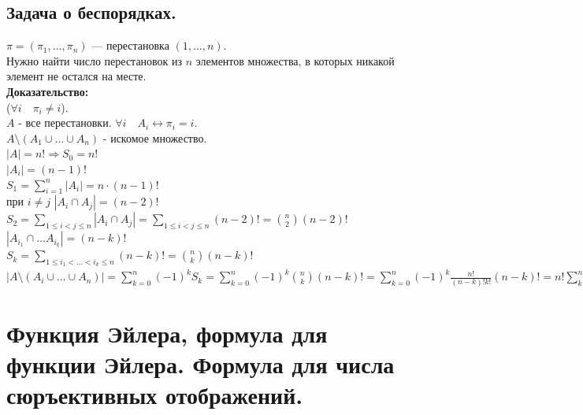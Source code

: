 \documentclass[12pt]{article}
\begin{document}
\subsection{Задача о беспорядках.}
	$ \pi = (\pi_1, \ldots ,\pi_n) $ — перестановка $(1,\ldots,n)$.\\
	Нужно найти число перестановок из $n$ элементов множества, в которых никакой элемент не остался на месте.\\	
	\textbf{Доказательство:}\\
	($\forall i \quad \pi_i \not= i$).\\
	$A$ - все перестановки. $\forall i \quad A_i \leftrightarrow \pi_i = i $.\\
	$ A \setminus (A_1 \cup \ldots \cup A_n)$ - искомое множество.\\
	$ |A| = n! \Rightarrow S_0 = n!$\\
	$ |A_i| = (n-1)! $\\
	$ \displaystyle S_1 = \sum_{i=1}^n |A_i| = n\cdot(n-1)!$\\
	при $i \neq j$ $ |A_i \cap A_j| = (n-2)!$\\
	$ \displaystyle S_2 = \sum_{1 \le i < j \le n}  |A_i \cap A_j| = \sum_{1\le i < j\le n} (n-2)! =
	\binom{n}{2} (n-2)! $ \\
	$ | A_{i_1} \cap \ldots A_{i_k} | = (n-k)! $\\
	$ \displaystyle S_k = \sum_{1 \le i_1 < \ldots < i_k \le n} (n-k)! = \binom{n}{k} (n-k)! $\\
	$ \displaystyle | A\setminus(A_i \cup \ldots \cup A_n)| = \sum_{k=0}^n (-1)^k S_k = \sum_{k=0}^n
	(-1)^k \binom{n}{k}(n-k)! = \sum_{k=0}^n(-1)^k\frac{n!}{(n-k)!k!} (n-k)! = n!\sum_{k=0}^n \frac{
	(-1)^k}{k!}$\\
	\qedsymbol

\section{Функция Эйлера, формула для функции Эйлера. Формула для числа сюръективных отображений.}
\end{document}
